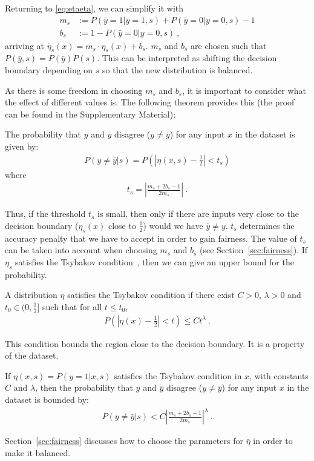 Returning to \eqref{eq:etaeta}, we can simplify it with
\begin{align}
  m_s &:= P(\bar{y}=1|y=1,s) + P(\bar{y}=0|y=0,s) - 1\\
  b_s &:= 1 - P(\bar{y}=0|y=0,s)~,
\end{align}
arriving at $\bar{\eta}_s(x)=m_s\cdot \eta_s(x) + b_s$.
$m_s$ and $b_s$ are chosen such that $P(\bar{y}, s)=P(\bar{y})P(s)$.
This can be interpreted as shifting the decision boundary depending on $s$ so that the new distribution is balanced.

As there is some freedom in choosing $m_s$ and $b_s$, it is important to consider what the effect of different values is.
The following theorem provides this (the proof can be found in the Supplementary Material):

\begin{theorem}\label{th:prob}
  The probability that $y$ and $\bar{y}$ disagree ($y\neq\bar{y}$) for any input $x$ in the dataset is given by:
  \begin{align}
    P(y\neq\bar{y}|s)=P\left(\left|\eta(x,s) - \tfrac{1}{2}\right| < t_s\right)
  \end{align}
  where
  \begin{align}
    t_s = \left|\frac{m_s+2b_s-1}{2m_s}\right|~.\label{eq:def-ts}
  \end{align}
\end{theorem}
Thus, if the threshold $t_s$ is small,
then only if there are inputs very close to the decision boundary ($\eta_s(x)$ close to $\tfrac{1}{2}$)
would we have $\bar{y}\neq y$.
$t_s$ determines the accuracy penalty that we have to accept in order to gain fairness.
The value of $t_s$ can be taken into account when choosing $m_s$ and $b_s$ (see Section~\ref{sec:fairness}).
If $\eta_s$ satisfies the Tsybakov condition~\citep{tsybakov2004optimal},
then we can give an upper bound for the probability.
\begin{definition}
  A distribution $\eta$ satisfies the Tsybakov condition if there exist $C>0$, $\lambda > 0$ and $t_0\in (0,\tfrac{1}{2}]$
  such that for all $t\leq t_0$,
  \begin{align}
    P\left(\left|\eta(x)-\tfrac{1}{2}\right|<t\right)\leq Ct^\lambda~.
  \end{align}
\end{definition}
This condition bounds the region close to the decision boundary.
It is a property of the dataset.
\begin{corollary}\label{th:upperbound}
  If $\eta(x,s)=P(y=1|x,s)$ satisfies the Tsybakov condition in $x$, with constants $C$ and $\lambda$,
  then the probability that $y$ and $\bar{y}$ disagree ($y\neq\bar{y}$) for any input $x$ in the dataset is bounded by:
  \begin{align}
    P(y\neq\bar{y}|s)<C\left|\frac{m_s+2b_s-1}{2m_s}\right|^\lambda~.
  \end{align}
\end{corollary}
Section~\ref{sec:fairness} discusses how to choose the parameters for $\bar{\eta}$ in order to make it balanced.

